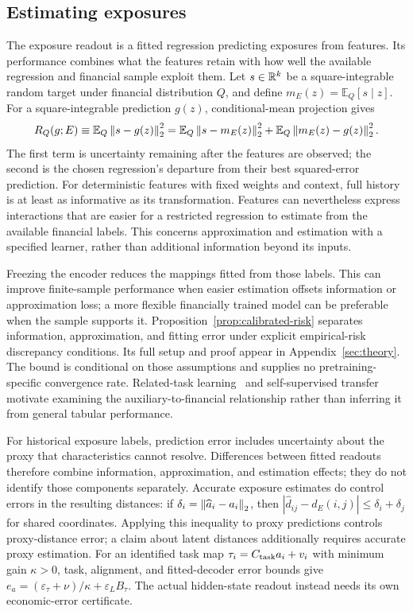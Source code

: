 \documentclass[11pt]{article}
\begin{document}
\subsection{Estimating exposures}
The exposure readout is a fitted regression predicting exposures from features.
Its performance combines what the features retain with how well the available
regression and financial sample exploit them. Let $s\in\mathbb{R}^k$ be a
square-integrable random target under financial distribution $Q$, and define
$m_E(z)=\mathbb E_Q[s\mid z]$. For a square-integrable prediction $g(z)$,
conditional-mean projection gives
\begin{equation}\label{eq:readout-split}
  R_Q(g;E)\equiv\mathbb E_Q\left\lVert s-g(z)\right\rVert_2^2
  =\mathbb E_Q\left\lVert s-m_E(z)\right\rVert_2^2
  +\mathbb E_Q\left\lVert m_E(z)-g(z)\right\rVert_2^2.
\end{equation}
The first term is uncertainty remaining after the features are observed; the
second is the chosen regression's departure from their best squared-error
prediction. For deterministic features with fixed weights and
context, full history is at
least as informative as its transformation. Features can nevertheless express
interactions that are easier for a restricted regression to estimate from the
available financial labels. This concerns approximation and estimation with a
specified learner, rather than additional information beyond its inputs.

Freezing the encoder reduces the mappings fitted from those labels. This can
improve finite-sample performance when easier estimation offsets information or
approximation loss; a more flexible financially trained model can be preferable
when the sample supports it. Proposition~\ref{prop:calibrated-risk} separates
information, approximation, and fitting error under explicit empirical-risk
discrepancy conditions. Its full setup and proof appear in
Appendix~\ref{sec:theory}. The bound is conditional on those assumptions and
supplies no pretraining-specific convergence rate. Related-task
learning~\cite{baxter,maurer} and self-supervised transfer~\cite{lee} motivate
examining the auxiliary-to-financial relationship rather than inferring it
from general tabular performance.

For historical exposure labels, prediction error includes uncertainty about the
proxy that characteristics cannot resolve. Differences between fitted readouts
therefore combine information, approximation, and estimation effects; they do
not identify those components separately. Accurate exposure estimates do control
errors in the resulting distances: if
$\delta_i=\left\lVert\widehat a_i-a_i\right\rVert_2$, then
$|\widehat d_{ij}-d_E(i,j)|\le\delta_i+\delta_j$ for shared coordinates.
Applying this inequality to proxy predictions controls proxy-distance error;
a claim about latent distances additionally requires accurate proxy estimation.
For an identified task map $\tau_i=C_{\rm task}a_i+v_i$ with minimum gain
$\kappa>0$, task, alignment, and fitted-decoder error bounds give
$e_a=(\varepsilon_\tau+\nu)/\kappa+\varepsilon_L B_\tau$.
The actual hidden-state readout instead needs its own economic-error
certificate.
\end{document}
